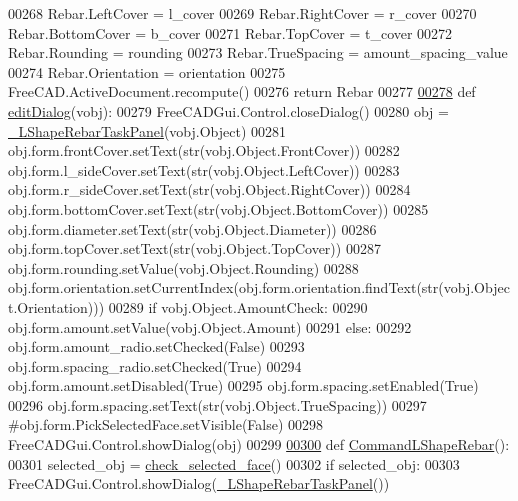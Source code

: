 \begin{DoxyCode}
00268     Rebar.LeftCover = l\_cover
00269     Rebar.RightCover = r\_cover
00270     Rebar.BottomCover = b\_cover
00271     Rebar.TopCover = t\_cover
00272     Rebar.Rounding = rounding
00273     Rebar.TrueSpacing = amount\_spacing\_value
00274     Rebar.Orientation = orientation
00275     FreeCAD.ActiveDocument.recompute()
00276     \textcolor{keywordflow}{return} Rebar
00277 
\hypertarget{LShapeRebar_8py_source.tex_l00278}{}\hyperlink{namespaceLShapeRebar_a73f1b8d577fecf230a8c071424b2015e}{00278} \textcolor{keyword}{def }\hyperlink{namespaceLShapeRebar_a73f1b8d577fecf230a8c071424b2015e}{editDialog}(vobj):
00279     FreeCADGui.Control.closeDialog()
00280     obj = \hyperlink{classLShapeRebar_1_1__LShapeRebarTaskPanel}{\_LShapeRebarTaskPanel}(vobj.Object)
00281     obj.form.frontCover.setText(str(vobj.Object.FrontCover))
00282     obj.form.l\_sideCover.setText(str(vobj.Object.LeftCover))
00283     obj.form.r\_sideCover.setText(str(vobj.Object.RightCover))
00284     obj.form.bottomCover.setText(str(vobj.Object.BottomCover))
00285     obj.form.diameter.setText(str(vobj.Object.Diameter))
00286     obj.form.topCover.setText(str(vobj.Object.TopCover))
00287     obj.form.rounding.setValue(vobj.Object.Rounding)
00288     obj.form.orientation.setCurrentIndex(obj.form.orientation.findText(str(vobj.Object.Orientation)))
00289     \textcolor{keywordflow}{if} vobj.Object.AmountCheck:
00290         obj.form.amount.setValue(vobj.Object.Amount)
00291     \textcolor{keywordflow}{else}:
00292         obj.form.amount\_radio.setChecked(\textcolor{keyword}{False})
00293         obj.form.spacing\_radio.setChecked(\textcolor{keyword}{True})
00294         obj.form.amount.setDisabled(\textcolor{keyword}{True})
00295         obj.form.spacing.setEnabled(\textcolor{keyword}{True})
00296         obj.form.spacing.setText(str(vobj.Object.TrueSpacing))
00297     \textcolor{comment}{#obj.form.PickSelectedFace.setVisible(False)}
00298     FreeCADGui.Control.showDialog(obj)
00299 
\hypertarget{LShapeRebar_8py_source.tex_l00300}{}\hyperlink{namespaceLShapeRebar_a5439b0c3265fa6d432d4a81e47f4441e}{00300} \textcolor{keyword}{def }\hyperlink{namespaceLShapeRebar_a5439b0c3265fa6d432d4a81e47f4441e}{CommandLShapeRebar}():
00301     selected\_obj = \hyperlink{namespaceRebarfunc_adae2713855a7e1b4bda04081ae671542}{check\_selected\_face}()
00302     \textcolor{keywordflow}{if} selected\_obj:
00303         FreeCADGui.Control.showDialog(\hyperlink{classLShapeRebar_1_1__LShapeRebarTaskPanel}{\_LShapeRebarTaskPanel}())
\end{DoxyCode}
